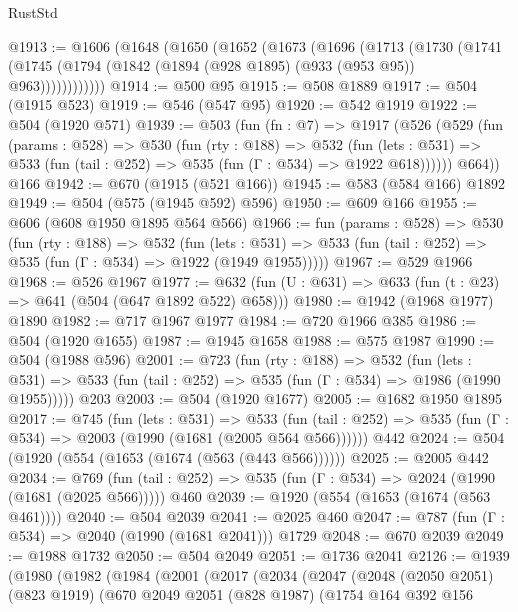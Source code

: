 \begin{lexlean}{RustStd}
\begin{coremodule}
@1913 := @1606
    (@1648
      (@1650
        (@1652
          (@1673
            (@1696
              (@1713
                (@1730
                  (@1741 (@1745 (@1794 (@1842 (@1894 (@928 @1895) (@933 (@953 @95)) @963))))))))))))
@1914 := @500 @95
@1915 := @508 @1889
@1917 := @504 (@1915 @523)
@1919 := @546 (@547 @95)
@1920 := @542 @1919
@1922 := @504 (@1920 @571)
@1939 := @503
    (fun (fn : @7) =>
    @1917
      (@526
        (@529
          (fun (params : @528) =>
          @530
            (fun (rty : @188) =>
            @532
              (fun (lets : @531) =>
              @533 (fun (tail : @252) => @535 (fun (Γ : @534) => @1922 @618))))))
        @664))
    @166
@1942 := @670 (@1915 (@521 @166))
@1945 := @583 (@584 @166) @1892
@1949 := @504 (@575 (@1945 @592) @596)
@1950 := @609 @166
@1955 := @606 (@608 @1950 @1895 @564 @566)
@1966 := fun (params : @528) =>
  @530
    (fun (rty : @188) =>
    @532
      (fun (lets : @531) =>
      @533 (fun (tail : @252) => @535 (fun (Γ : @534) => @1922 (@1949 @1955)))))
@1967 := @529 @1966
@1968 := @526 @1967
@1977 := @632 (fun (U : @631) => @633 (fun (t : @23) => @641 (@504 (@647 @1892 @522) @658)))
@1980 := @1942 (@1968 @1977) @1890
@1982 := @717 @1967 @1977
@1984 := @720 @1966 @385
@1986 := @504 (@1920 @1655)
@1987 := @1945 @1658
@1988 := @575 @1987
@1990 := @504 (@1988 @596)
@2001 := @723
    (fun (rty : @188) =>
    @532
      (fun (lets : @531) =>
      @533 (fun (tail : @252) => @535 (fun (Γ : @534) => @1986 (@1990 @1955)))))
    @203
@2003 := @504 (@1920 @1677)
@2005 := @1682 @1950 @1895
@2017 := @745
    (fun (lets : @531) =>
    @533 (fun (tail : @252) => @535 (fun (Γ : @534) => @2003 (@1990 (@1681 (@2005 @564 @566))))))
    @442
@2024 := @504 (@1920 (@554 (@1653 (@1674 (@563 (@443 @566))))))
@2025 := @2005 @442
@2034 := @769
    (fun (tail : @252) => @535 (fun (Γ : @534) => @2024 (@1990 (@1681 (@2025 @566)))))
    @460
@2039 := @1920 (@554 (@1653 (@1674 (@563 @461))))
@2040 := @504 @2039
@2041 := @2025 @460
@2047 := @787 (fun (Γ : @534) => @2040 (@1990 (@1681 @2041))) @1729
@2048 := @670 @2039
@2049 := @1988 @1732
@2050 := @504 @2049
@2051 := @1736 @2041
@2126 := @1939
    (@1980
      (@1982
        (@1984
          (@2001
            (@2017
              (@2034
                (@2047
                  (@2048
                    (@2050 @2051)
                    (@823 @1919)
                    (@670
                      @2049
                      @2051
                      (@828 @1987)
                      (@1754
                        @164
                        @392
                        @156

\end{coremodule}
\end{lexlean}
